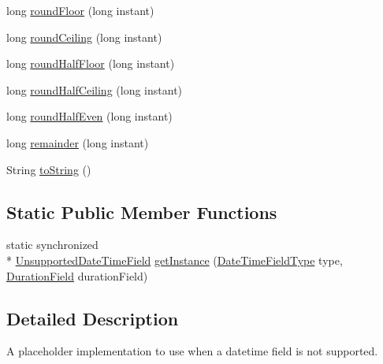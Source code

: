 \begin{DoxyCompactItemize}
\item 
long \hyperlink{classorg_1_1joda_1_1time_1_1field_1_1_unsupported_date_time_field_aa1eb8c52f4f054abdeba2a2870fdcb45}{round\-Floor} (long instant)
\item 
long \hyperlink{classorg_1_1joda_1_1time_1_1field_1_1_unsupported_date_time_field_a58fcc9a71f4adc273329fba02d2e45b7}{round\-Ceiling} (long instant)
\item 
long \hyperlink{classorg_1_1joda_1_1time_1_1field_1_1_unsupported_date_time_field_a58a2d236de96cc91e6ec3d1cbe8a08f5}{round\-Half\-Floor} (long instant)
\item 
long \hyperlink{classorg_1_1joda_1_1time_1_1field_1_1_unsupported_date_time_field_acf5a3e537293e4649b171f07d167dbd3}{round\-Half\-Ceiling} (long instant)
\item 
long \hyperlink{classorg_1_1joda_1_1time_1_1field_1_1_unsupported_date_time_field_ad189b9108258f99ec65f5a9b742e692e}{round\-Half\-Even} (long instant)
\item 
long \hyperlink{classorg_1_1joda_1_1time_1_1field_1_1_unsupported_date_time_field_a05b4febf235ed88c1877c171575e5abc}{remainder} (long instant)
\item 
String \hyperlink{classorg_1_1joda_1_1time_1_1field_1_1_unsupported_date_time_field_ac3e09fac27231e85a250e94c97985af6}{to\-String} ()
\end{DoxyCompactItemize}
\subsection*{Static Public Member Functions}
\begin{DoxyCompactItemize}
\item 
static synchronized \\*
\hyperlink{classorg_1_1joda_1_1time_1_1field_1_1_unsupported_date_time_field}{Unsupported\-Date\-Time\-Field} \hyperlink{classorg_1_1joda_1_1time_1_1field_1_1_unsupported_date_time_field_af90db41fcf6f411bf2ca7492bf34cbd6}{get\-Instance} (\hyperlink{classorg_1_1joda_1_1time_1_1_date_time_field_type}{Date\-Time\-Field\-Type} type, \hyperlink{classorg_1_1joda_1_1time_1_1_duration_field}{Duration\-Field} duration\-Field)
\end{DoxyCompactItemize}


\subsection{Detailed Description}
A placeholder implementation to use when a datetime field is not supported. 

